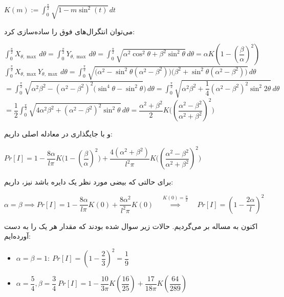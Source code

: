 \documentclass{scribe-cgenomics}
\begin{document}
\begin{حل}
\begin{center}
$
K(m) := \int_{0}^{\frac{\pi}{2}} \sqrt{1-m\sin ^2(t)}\, dt
$
\end{center}

می‌توان انتگرال‌های فوق را ساده‌سازی کرد:

\begin{center}
$
\int_{0}^{\frac{\pi}{2}} X_{\theta, \max}\, d\theta
= \int_{0}^{\frac{\pi}{2}} Y_{\theta, \max} \, d\theta
= \int_{0}^{\frac{\pi}{2}} \sqrt{\alpha^2 \cos^2 \theta + \beta^2 \sin^2 \theta}\, d\theta
= \alpha K(1-(\dfrac{\beta}{\alpha})^2)
$
\bigbreak
$
\int_{0}^{\frac{\pi}{2}} X_{\theta, \max}Y_{\theta, \max}\, d\theta 
= \int_{0}^{\frac{\pi}{2}} \sqrt{\Big(\alpha^2 - \sin^2 \theta (\alpha^2 - \beta^2)\Big) \Big( \beta^2 + \sin^2 \theta (\alpha^2 - \beta^2) \Big)} \, d\theta 
$
\bigbreak
$
=\int_{0}^{\frac{\pi}{2}}\sqrt{\alpha^2 \beta^2 -(\alpha^2 - \beta^2)^2 (\sin^4 \theta - \sin^2 \theta}) \, d\theta
=\int_{0}^{\frac{\pi}{2}}\sqrt{\alpha^2 \beta^2 +\dfrac{1}{4}(\alpha^2 - \beta^2)^2 \sin^2 2\theta} \, d\theta
$
\bigbreak
$
=\dfrac{1}{2}\int_{0}^{\frac{\pi}{2}}\sqrt{4\alpha^2 \beta^2 +(\alpha^2 - \beta^2)^2 \sin^2 \theta} \, d\theta
= \dfrac{\alpha^2 + \beta^2}{2} K\Big( (\dfrac{\alpha^2 - \beta^2}{\alpha^2 + \beta^2})^2 \Big)
$
\end{center}

و با جایگذاری در معادله اصلی داریم:

\begin{center}
$
Pr[I] = 1 - \dfrac{8\alpha}{l\pi} K\Big( 1-(\dfrac{\beta}{\alpha})^2 \Big) + 
\dfrac{4(\alpha^2 + \beta^2)}{l^2\pi} K\Big( (\dfrac{\alpha^2 - \beta^2}{\alpha^2 + \beta^2})^2 \Big)
$
\end{center}

برای حالتی که بیضی مورد نظر یک دایره باشد نیز، داریم:

\begin{center}
$
\alpha=\beta \implies Pr[I] = 1 - \dfrac{8\alpha}{l\pi}K(0) + \dfrac{8\alpha^2}{l^2\pi}K(0)
\quad \overset{K(0)=\frac{\pi}{2}}{\implies} \quad
Pr[I] = (1-\dfrac{2\alpha}{l})^2
$
\end{center}

اکنون به مساله بر می‌گردیم. حالات زیر سوال شده بودند که مقدار هر یک را به دست آورده‌ایم:

\begin{LTR}
\begin{itemize}
\item{
$
\alpha = \beta = 1:\
Pr[I] = (1-\dfrac{2}{3})^2 = \dfrac{1}{9}
$
}
\item{
$
\alpha=\dfrac{5}{4}, \beta=\dfrac{3}{4}\
Pr[I] = 1 - \dfrac{10}{3\pi} K(\dfrac{16}{25}) + \dfrac{17}{18\pi} K(\dfrac{64}{289}) 
$
}
\end{itemize}
\end{LTR}


\end{حل}
\end{document}
